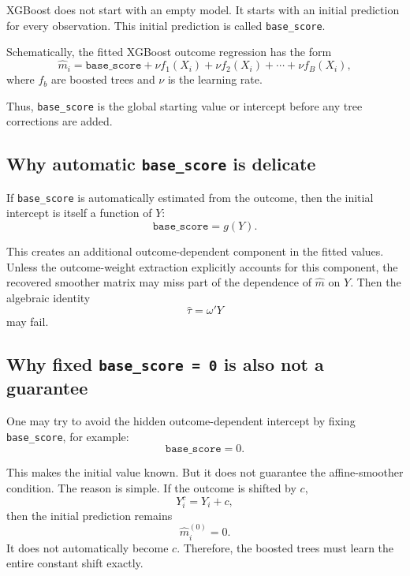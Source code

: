 \documentclass[11pt,a4paper]{article}
\begin{document}
XGBoost does not start with an empty model. It starts with an initial prediction
for every observation. This initial prediction is called \texttt{base\_score}.

Schematically, the fitted XGBoost outcome regression has the form
\begin{equation}
    \hat m_i
    =
    \texttt{base\_score}
    +
    \nu f_1(X_i)
    +
    \nu f_2(X_i)
    +
    \cdots
    +
    \nu f_B(X_i),
    \label{eq:xgb_prediction}
\end{equation}
where \(f_b\) are boosted trees and \(\nu\) is the learning rate.

Thus, \texttt{base\_score} is the global starting value or intercept before any
tree corrections are added.

\subsection{Why automatic \texttt{base\_score} is delicate}

If \texttt{base\_score} is automatically estimated from the outcome, then the
initial intercept is itself a function of \(Y\):
\begin{equation}
    \texttt{base\_score} = g(Y).
\end{equation}

This creates an additional outcome-dependent component in the fitted values.
Unless the outcome-weight extraction explicitly accounts for this component, the
recovered smoother matrix may miss part of the dependence of \(\hat m\) on \(Y\).
Then the algebraic identity
\begin{equation}
    \hat\tau = \omega'Y
\end{equation}
may fail.

\subsection{Why fixed \texttt{base\_score = 0} is also not a guarantee}

One may try to avoid the hidden outcome-dependent intercept by fixing
\texttt{base\_score}, for example:
\begin{equation}
    \texttt{base\_score}=0.
\end{equation}

This makes the initial value known. But it does not guarantee the affine-smoother
condition. The reason is simple. If the outcome is shifted by \(c\),
\begin{equation}
    Y_i^c = Y_i+c,
\end{equation}
then the initial prediction remains
\begin{equation}
    \hat m_i^{(0)}=0.
\end{equation}
It does not automatically become \(c\). Therefore, the boosted trees must learn
the entire constant shift exactly.
\end{document}
